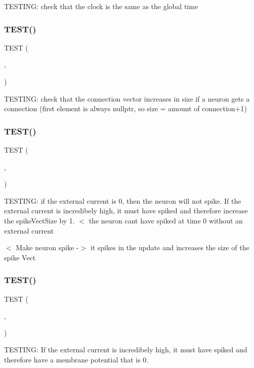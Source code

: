 T\+E\+S\+T\+I\+NG\+: check that the clock is the same as the global time \mbox{\label{unittest_8cpp_a1cd50acc8515f5cf523e4b5f76695e59}} 
\subsubsection{T\+E\+S\+T()\hspace{0.1cm}{\footnotesize\ttfamily [4/6]}}
{\footnotesize\ttfamily T\+E\+ST (\begin{DoxyParamCaption}\item[{Neuron\+Test}]{,  }\item[{Connection\+Size}]{ }\end{DoxyParamCaption})}

T\+E\+S\+T\+I\+NG\+: check that the connection vector increases in size if a neuron gets a connection (first element is always nullptr, so size = amount of connection+1) \mbox{\label{unittest_8cpp_af6a3a96f9fda0fd1ea3d4fb4d8b237cb}} 
\subsubsection{T\+E\+S\+T()\hspace{0.1cm}{\footnotesize\ttfamily [5/6]}}
{\footnotesize\ttfamily T\+E\+ST (\begin{DoxyParamCaption}\item[{Neuron\+Test}]{,  }\item[{Spiked}]{ }\end{DoxyParamCaption})}

T\+E\+S\+T\+I\+NG\+: if the external current is 0, then the neuron will not spike. If the external current is incredibely high, it must have spiked and therefore increase the spike\+Vect\+Size by 1. $<$ the neuron can\textquotesingle{}t have spiked at time 0 without an external current

$<$ Make neuron spike -\/$>$ it spikes in the update and increases the size of the spike Vect \mbox{\label{unittest_8cpp_ad94c8421eb019f0b3ae551bb4c4f9bd3}} 
\subsubsection{T\+E\+S\+T()\hspace{0.1cm}{\footnotesize\ttfamily [6/6]}}
{\footnotesize\ttfamily T\+E\+ST (\begin{DoxyParamCaption}\item[{Neuron\+Test}]{,  }\item[{Reset\+Membrane\+Pot}]{ }\end{DoxyParamCaption})}

T\+E\+S\+T\+I\+NG\+: If the external current is incredibely high, it must have spiked and therefore have a membrane potential that is 0. 